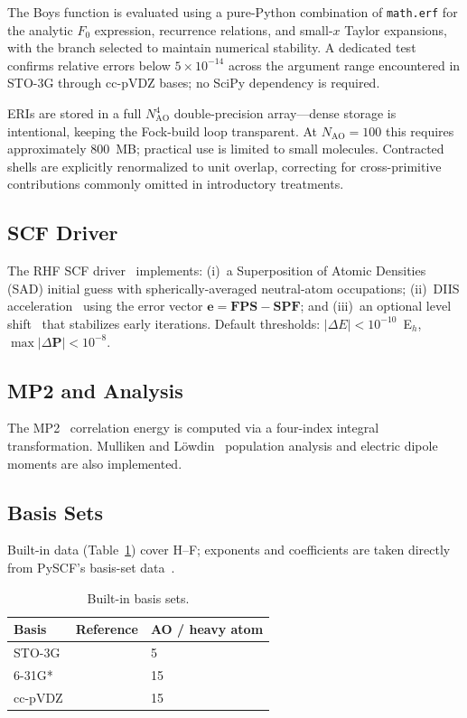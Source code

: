 \documentclass[1p,times]{elsarticle}
\begin{document}
The Boys function is evaluated using a pure-Python combination of
\texttt{math.erf} for the analytic $F_0$ expression, recurrence relations, and
small-$x$ Taylor expansions, with the branch selected to maintain numerical
stability.
A dedicated test confirms relative errors below $5\times10^{-14}$ across the
argument range encountered in STO-3G through cc-pVDZ bases; no SciPy
dependency is required.

ERIs are stored in a full $N_\mathrm{AO}^4$ double-precision array---dense
storage is intentional, keeping the Fock-build loop transparent.
At $N_\mathrm{AO}=100$ this requires approximately 800~MB; practical use is
limited to small molecules.
Contracted shells are explicitly renormalized to unit overlap, correcting for
cross-primitive contributions commonly omitted in introductory treatments.

\subsection{SCF Driver}

The RHF SCF driver~\cite{roothaan1951,hall1951} implements:
(i)~a Superposition of Atomic Densities (SAD) initial guess with
spherically-averaged neutral-atom occupations;
(ii)~DIIS acceleration~\cite{pulay1980,pulay1982} using the error vector
$\mathbf{e}=\mathbf{FPS}-\mathbf{SPF}$; and
(iii)~an optional level shift~\cite{saunders1973} that stabilizes early
iterations.
Default thresholds: $|\Delta E|<10^{-10}$~E$_h$,
$\max|\Delta\mathbf{P}|<10^{-8}$.

\subsection{MP2 and Analysis}

The MP2~\cite{moller1934} correlation energy is computed via a four-index
integral transformation.
Mulliken and L{\"o}wdin~\cite{lowdin1950} population analysis and electric
dipole moments are also implemented.

\subsection{Basis Sets}

Built-in data (Table~\ref{tab:basis}) cover H--F; exponents and coefficients
are taken directly from PySCF's basis-set data~\cite{pritchard2019}.

\begin{table}[H]
\caption{Built-in basis sets.}
\label{tab:basis}
\begin{tabularx}{\columnwidth}{llX}
\toprule
\textbf{Basis} & \textbf{Reference} & \textbf{AO / heavy atom} \\
\midrule
STO-3G  & \cite{hehre1969}                          & 5  \\
6-31G*  & \cite{hehre1972,hariharan1973}            & 15 \\
cc-pVDZ & \cite{dunning1989}                        & 15 \\
\bottomrule
\end{tabularx}
\end{table}
\end{document}
